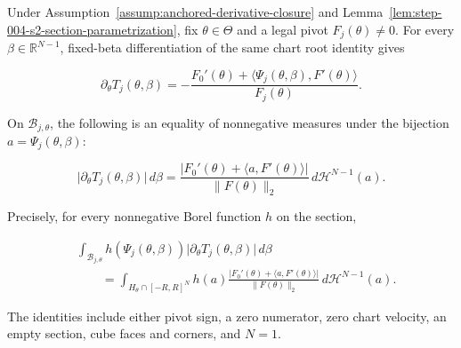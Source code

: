 \begin{lemma}
\label{lem:step-004-s2-normal-density}

Under Assumption~\ref{assump:anchored-derivative-closure} and
Lemma~\ref{lem:step-004-s2-section-parametrization}, fix \(\theta\in\Theta\) and a legal pivot
\(F_j(\theta)\neq0\). For every \(\beta\in\mathbb R^{N-1}\), fixed-beta differentiation of the same chart
root identity gives

\begin{equation}
\label{eq:appendix-display-119}
\partial_\theta T_j(\theta,\beta)
=-
\frac{F_0'(\theta)
+\langle\Psi_j(\theta,\beta),F'(\theta)\rangle}
{F_j(\theta)}.
\end{equation}

On \(\mathcal B_{j,\theta}\), the following is an equality of nonnegative measures under the bijection
\(a=\Psi_j(\theta,\beta)\):

\begin{equation}
\label{eq:appendix-display-120}
\lvert\partial_\theta T_j(\theta,\beta)\rvert\,d\beta
=
\frac{\lvert F_0'(\theta)+\langle a,F'(\theta)\rangle\rvert}
{\lVert F(\theta)\rVert_2}
\,d\mathcal H^{N-1}(a).
\end{equation}

Precisely, for every nonnegative Borel function \(h\) on the section,

\begin{equation}
\label{eq:appendix-display-121}
\begin{aligned}
&\int_{\mathcal B_{j,\theta}}
h(\Psi_j(\theta,\beta))
\lvert\partial_\theta T_j(\theta,\beta)\rvert\,d\beta\\
&\qquad=
\int_{H_\theta\cap[-R,R]^N}
h(a)
\frac{\lvert F_0'(\theta)+\langle a,F'(\theta)\rangle\rvert}
{\lVert F(\theta)\rVert_2}
\,d\mathcal H^{N-1}(a).
\end{aligned}
\end{equation}

The identities include either pivot sign, a zero numerator, zero chart velocity, an empty section, cube faces
and corners, and \(N=1\).


\end{lemma}

